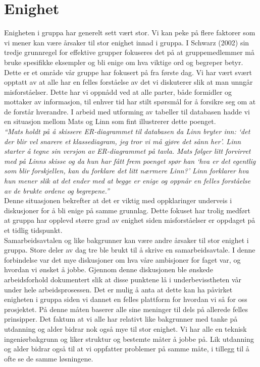 \section{Enighet}
\label{sec:enighet}
Enigheten i gruppa har generelt sett vært stor. Vi kan peke på flere faktorer som vi mener kan være årsaker til stor enighet innad i gruppa. I Schwarz (2002) \citep{fasilitator} sin tredje grunnregel for effektive grupper fokuseres det på at gruppemedlemmer må bruke spesifikke eksempler og bli enige om hva viktige ord og begreper betyr. Dette er et område vår gruppe har fokusert på fra første dag. Vi har vært svært opptatt av at alle har en felles forståelse av det vi diskuterer slik at man unngår misforståelser. Dette har vi oppnådd ved at alle parter, både formidler og mottaker av informasjon, til enhver tid har stilt spørsmål for å forsikre seg om at de forstår hverandre. I arbeid med utforming av tabeller til databasen hadde vi en situasjon mellom Mats og Linn som fint illustrerer dette poenget.\\

\textit{``Mats holdt på å skissere ER-diagrammet til databasen da Linn bryter inn: `det der blir vel snarere et klassediagram, jeg tror vi må gjøre det sånn her'. Linn starter å tegne sin versjon av ER-diagrammet på tavla. Mats følger litt forvirret med på Linns skisse og da hun har fått frem poenget spør han `hva er det egentlig som blir forskjellen, kan du forklare det litt nærmere Linn?' Linn forklarer hva hun mener slik at det ender med at begge er enige og oppnår en felles forståelse av de brukte ordene og begrepene.''}\\

Denne situasjonen bekrefter at det er viktig med oppklaringer underveis i diskusjoner for å bli enige på samme grunnlag. Dette fokuset har trolig medført at gruppa har opplevd større grad av enighet siden misforståelser er oppdaget på et tidlig tidspunkt.\\

Samarbeidsavtalen og like bakgrunner kan være andre årsaker til stor enighet i gruppa. Store deler av dag tre ble brukt til å skrive en samarbeidsavtale. I denne forbindelse var det mye diskusjoner om hva våre ambisjoner for faget var, og hvordan vi ønsket å jobbe. Gjennom denne diskusjonen ble ønskede arbeidsforhold dokumentert slik at disse punktene lå i underbevisstheten vår under hele arbeidsprosessen. Det er mulig å anta at dette kan ha påvirket enigheten i gruppa siden vi dannet en felles plattform for hvordan vi så for oss prosjektet. På denne måten baserer alle sine meninger til dels på allerede felles prinsipper. Det faktum at vi alle har relativt like bakgrunner med tanke på utdanning og alder bidrar nok også mye til stor enighet. Vi har alle en teknisk ingeniørbakgrunn og liker struktur og bestemte måter å jobbe på. Lik utdanning og alder bidrar også til at vi oppfatter problemer på samme måte, i tillegg til å ofte se de samme løsningene.\\

